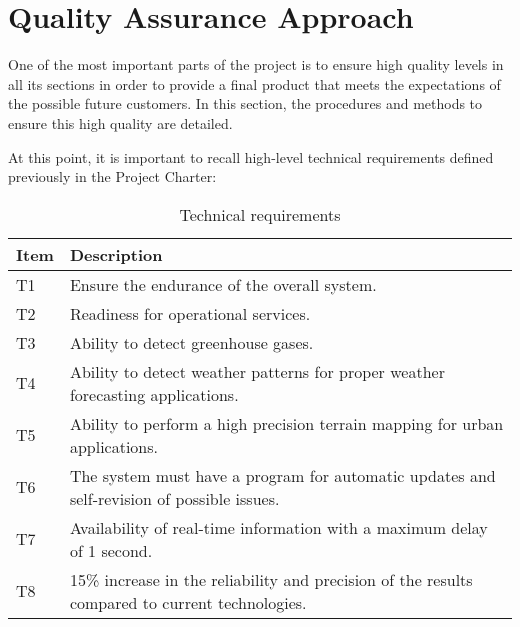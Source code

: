 \section{Quality Assurance Approach}
One of the most important parts of the project is to ensure high quality levels in all its sections in order to provide a final product that meets the expectations of the possible future customers. In this section, the procedures and methods to ensure this high quality are detailed. 

At this point, it is important to recall high-level technical requirements defined previously in the Project Charter:
\begin{table}[H]
	\centering
	\begin{tabular}{l p{13.3cm}}
		
		\toprule[2pt]
		
		\textbf{Item} &  \textbf{Description}\\
		
		\midrule [1.5pt]
		
		T1 & Ensure the endurance of the overall system.\vspace{0.2cm}\\
		
		\midrule
		
		T2 & Readiness for operational services.\vspace{0.2cm}\\
		
		\midrule
		
		T3 & Ability to detect greenhouse gases.\vspace{0.2cm}\\
		
		\midrule
		
		T4 & Ability to detect weather patterns for proper weather forecasting applications.\vspace{0.2cm}\\
		
		\midrule
		
		T5 & Ability to perform a high precision terrain mapping for urban applications.\vspace{0.2cm}\\
		
		\midrule
		
		T6 & The system must have a program for automatic updates and self-revision of possible issues.\vspace{0.2cm}\\
		
		\midrule
		
		T7 & Availability of real-time information with a maximum delay of 1 second.\vspace{0.2cm}\\
		
		\midrule
		
		T8 & 15\% increase in the reliability and precision of the results compared to current technologies.\vspace{0.2cm}\\
		
		\bottomrule[2pt]
		
	\end{tabular}
	\caption{Technical requirements}
\end{table}

